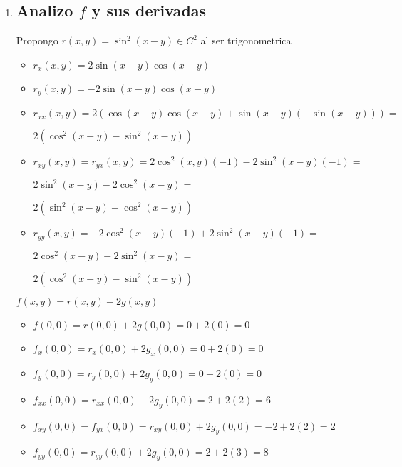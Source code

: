 \documentclass[../parcial.tex]{subfiles}
\begin{document}
    \begin{enumerate}
        \item 
            \subsection*{Analizo $f$ y sus derivadas}

            Propongo $r(x,y) = \sin^2(x-y) \in C^2$ al ser trigonometrica

            \begin{itemize}
                \item $r_x(x,y) = 2\sin(x-y)\cos(x-y)$
                \item $r_y(x,y) = -2\sin(x-y)\cos(x-y)$
                \item $r_{xx}(x,y) = 2(\cos(x-y)\cos(x-y) + \sin(x-y)(-\sin(x-y))) =$

                    $2(\cos^2(x-y) - \sin^2(x-y)) $
                \item $r_{xy}(x,y) = r_{yx}(x,y) = 2\cos^2(x,y)(-1) - 2\sin^2(x-y)(-1) = $
                
                    $2\sin^2(x-y) - 2\cos^2(x-y) = $

                    $2(\sin^2(x-y) - \cos^2(x-y))$

                \item $r_{yy}(x,y) = -2\cos^2(x-y)(-1) + 2\sin^2(x-y)(-1) =$

                    $ 2\cos^2(x-y) - 2\sin^2(x-y) = $

                    $ 2(\cos^2(x-y) - \sin^2(x-y)) $
            \end{itemize}

            $f(x,y) = r(x,y) + 2g(x,y)$

            \begin{itemize}
                \item $ f(0,0) = r(0,0) + 2g(0,0) = 0 + 2(0) = 0 $
                \item $ f_x(0,0) = r_x(0,0) + 2g_x(0,0) = 0 + 2(0) = 0$
                \item $ f_y(0,0) = r_y(0,0) + 2g_y(0,0) = 0 + 2(0) = 0$
                \item $ f_{xx}(0,0) = r_{xx}(0,0) + 2g_y(0,0) = 2 + 2(2) = 6$
                \item $ f_{xy}(0,0) = f_{yx}(0,0) = r_{xy}(0,0) + 2g_y(0,0) = -2 + 2(2) = 2$
                \item $ f_{yy}(0,0) = r_{yy}(0,0) + 2g_y(0,0) = 2 + 2(3) = 8$
            \end{itemize}


\end{enumerate}
\end{document}
